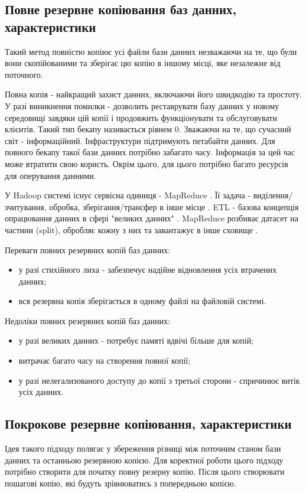 \subsection{Повне резервне копіювання баз данних, характеристики}
Такий метод повністю копіює усі файли бази данних незважаючи на те, що були вони скопійованими
та зберігає цю копію в іншому місці, яке незалежне від поточного.

Повна копія - найкращий захист данних, включаючи його швидкодію та простоту. У разі виникнення помилки - дозволить реставрувати базу данних у новому середовищі завдяки цій копії і
продовжить функціонувати та обслуговувати клієнтів. Такий тип бекапу називається рівнем 0.
Зважаючи на те, що сучасний світ - інформаційний. Інфраструктури підтримують петабайти данних.
Для повного бекапу такої бази данних потрібно забагато часу. Інформація за цей час може втратити свою користь.
Окрім цього, для цього потрібно багато ресурсів для оперування данними.

У Hadoop системі існує сервісна одиниця - MapReduce \cite{mapreduce2012}.
Її задача - виділення/зчитування, обробка, зберігання/трансфер в інше місце \cite{etl2017}.
ETL - базова концепція опрацювання данних в сфері "великих данних" \cite{bigdata2015}.
MapReduce розбиває датасет на частини (split), обробляє кожну з них та завантажує в інше сховище \cite{mapreduce2015cookbook}.

Переваги повних резервних копій баз данних:
\begin{itemize}
    \item у разі стихійного лиха - забезпечує надійне відновлення усіх втрачених данних;
    \item вся резервна копія зберігається в одному файлі на файловій системі.
\end{itemize}

Недоліки повних резервних копій баз данних:
\begin{itemize}
    \item у разі великих данних - потребує памяті вдвічі більше для копій;
    \item витрачає багато часу на створення повної копії;
    \item у разі нелегализованого доступу до копії з третьої сторони - спричинює витік усіх данних.
\end{itemize}

\subsection{Покрокове резервне копіювання, характеристики}
Ідея такого підходу полягає у збереження різниці між поточним станом бази данних та останньою резервною копією.
Для коректної роботи цього підходу потрібно створити для початку повну резерну копію.
Після цього створювати пошагові копію, які будуть зрівнюватись з попередньою копією.

